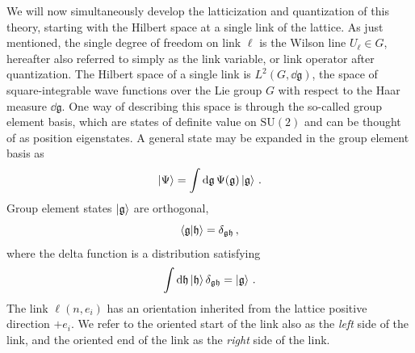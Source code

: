 \documentclass[reprint,superscriptaddress,pra,nofootinbib,preprintnumbers,floatfix]{revtex4-1}
\providecommand{\sutwo}{$\mathrm{SU}(2)$\xspace}
\providecommand{\g}{{\mathfrak{g}}}
\providecommand{\h}{{\mathfrak{h}}}
\begin{document}
We will now simultaneously develop the latticization and quantization of this theory, starting with the Hilbert space at a single link of the lattice. 
%
As just mentioned, the single degree of freedom on link $\ell$ is the Wilson line $U_\ell \in G$, hereafter also referred to simply as the link variable, or link operator after quantization. 
%
The Hilbert space of a single link is $L^2(G,\dd{\g})$, the space of square-integrable wave functions over the Lie group $G$ with respect to the Haar measure $\dd{\g}$.
%
One way of describing this space is through the so-called group element basis, which are states of definite value on \sutwo and can be thought of as position eigenstates. 
%
A general state may be expanded in the group element basis as
%
\begin{equation}
\ket{\Psi} = \int\dd{\g} \Psi(\g) \ket{\g} \,.
\end{equation}
%
Group element states $\ket{\g}$ are orthogonal,
%
\begin{equation}
\braket{\g}{\h} = \delta_{\g\h} \,,
\end{equation}
%
where the delta function is a distribution satisfying
%
\begin{equation}
\int\dd{\h} \ket{\h} \delta_{\g\h} = \ket{\g} \,.
\end{equation}
%
The link $\ell(n,e_i)$ has an orientation inherited from the lattice positive direction $+e_i$. 
%
We refer to the oriented start of the link also as the \emph{left} side of the link, and the oriented end of the link as the \emph{right} side of the link. 
\end{document}
